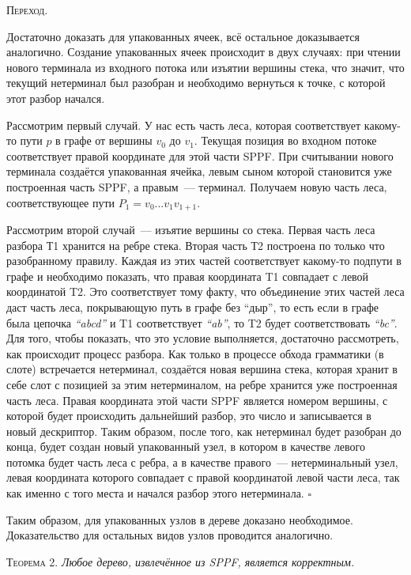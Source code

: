 \textsc{Переход.}

Достаточно доказать для упакованных ячеек, всё остальное доказывается аналогично. Создание упакованных ячеек происходит в двух случаях: при чтении нового терминала из входного потока или изъятии вершины стека, что значит, что текущий нетерминал был разобран и необходимо вернуться к точке, с которой этот разбор начался. 

Рассмотрим первый случай. У нас есть часть леса, которая соответствует какому-то пути $p$ в графе от вершины $v_0$ до $v_1$. Текущая позиция во входном потоке соответствует правой координате для этой части SPPF. При считывании нового терминала создаётся упакованная ячейка, левым сыном которой становится уже построенная часть SPPF, а правым~--- терминал. Получаем новую часть леса, соответствующее пути $P_1 = v_0 \dots v_1 v_{1+1}$.

Рассмотрим второй случай~--- изъятие вершины со стека. Первая часть леса разбора Т1 хранится на ребре стека. Вторая часть Т2 построена по только что разобранному правилу. Каждая из этих частей соответствует какому-то подпути в графе и необходимо показать, что правая координата T1 совпадает с левой координатой T2. Это соответствует тому факту, что объединение этих частей леса даст часть леса, покрывающую путь в графе без ``дыр'', то есть если в графе была цепочка {\it ``abcd''} и T1 соответствует {\it ``ab''}, то T2 будет соответствовать {\it ``bc''}. Для того, чтобы показать, что это условие выполняется, достаточно рассмотреть, как происходит процесс разбора. Как только в процессе обхода грамматики (в слоте) встречается нетерминал, создаётся новая вершина стека, которая хранит в себе слот с позицией за этим нетерминалом, на ребре хранится уже построенная часть леса. Правая координата этой части SPPF является номером вершины, с которой будет происходить дальнейший разбор, это число и записывается в новый дескриптор. Таким образом, после того, как нетерминал будет разобран до конца, будет создан новый упакованный узел, в котором в качестве левого потомка будет часть леса с ребра, а в качестве правого~--- нетерминальный узел, левая координата которого совпадает с правой координатой левой части леса, так как именно с того места и начался разбор этого нетерминала. $\square$

Таким образом, для упакованных узлов в дереве доказано необходимое. Доказательство для остальных видов узлов проводится аналогично.

\textsc{Теорема 2.} 
\textit{Любое дерево, извлечённое из SPPF, является корректным.}

